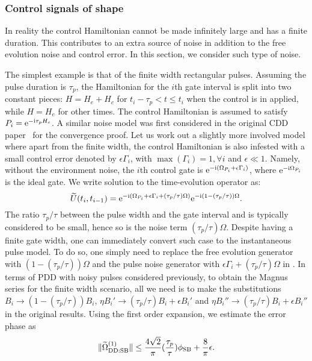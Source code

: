 \documentclass[pra,reprint,superscriptaddress]{revtex4-2}
\newcommand{\wt}[1]{\widetilde{#1}}
\newcommand{\rDD}{\mathrm{DD}}
\begin{document}
\subsubsection{Control signals of shape}
In reality the control Hamiltonian cannot be made infinitely large and 
has a finite duration. This contributes to an extra source of noise in addition
to the free evolution noise and control error.  In this section, we consider such type of noise. 

The simplest example is that of the finite width rectangular pulses. Assuming the pulse duration is $\tau_p$, the Hamiltonian  for the $i$th gate interval is split into two constant pieces: $H=H_e+H_c$ for $t_i -\tau_p  < t \le t_{i}$ when the control is in applied, while $H=H_e$ for other times. The control Hamiltonian is assumed to satisfy $P_i = \mathrm{e}^{-\mathrm{i} \tau_p H_c }$.
A similar noise model was first considered in the original CDD paper~\!\cite{khodjasteh2007performance} for the convergence proof. Let us work out a slightly more involved model where apart from the finite width, the control Hamiltonian is also infested with a small control error denoted by $\epsilon\Gamma_i$, with $\max{(\Gamma_i)}=1, \forall i$ and $\epsilon\ll 1$.  Namely, without the environment noise, the $i$th control gate
is $ \mathrm{e}^{-\mathrm{i} (\Omega_{P_i} +\epsilon \Gamma_i)}$, where $\mathrm{e}^{-\mathrm{i} \Omega_{P_i} }$ is the ideal gate. 
We write solution to the time-evolution operator as:
\begin{equation}
 \wt U(t_{i},t_{i-1}) =  \upe^{-\upi (\Omega_{P_i} +\epsilon \Gamma_i+
 (\tau_p/\tau) \Omega)}  \upe^{-\upi (1-(\tau_p/\tau)) \Omega}.
\end{equation}
The ratio $\tau_p/\tau$ between the pulse width and the gate interval and is typically considered to be small, hence so is the noise term $(\tau_p/\tau)\Omega$. Despite having a finite gate width,  one can immediately convert such case to the instantaneous pulse model.
To do so, one simply need to replace the free evolution generator with $ (1-(\tau_p/\tau)) \Omega$ and the pulse noise generator  with $\epsilon \Gamma_i + (\tau_p/\tau) \Omega$ in .
In terms of PDD with noisy pulses considered previously, to obtain the Magnus series for the finite width scenario, all we need is to make the substitutions $B_i \to (1-(\tau_p/\tau)) B_i$, $\eta B_i' \to (\tau_p/\tau) B_i + \epsilon B_i'$ and $\eta B_i'' \to (\tau_p/\tau) B_i + \epsilon B_i''$ in the original results. Using the first order expansion, we estimate the error phase as 
\begin{equation}\label{eq:PDD-rect1}
\norm{ \wt\Omega_{\rDD:\rSB}\up{1} }\le \frac{4\sqrt{2}}{\pi} (\frac{\tau_p}{\tau})\phi_\rSB +  \frac{8}{\pi} \epsilon.
\end{equation}
\end{document}
